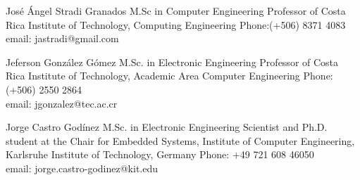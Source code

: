 \documentclass[]{friggeri-cv} %
\begin{document}
\begin{entrylist}

\entry
{}
{José Ángel Stradi Granados}
{M.Sc in Computer Engineering}
{Professor of Costa Rica Institute of Technology, Computing Engineering}
{Phone:(+506) 8371 4083 \\
email: jastradi@gmail.com
}

\entry
{}
{Jeferson González Gómez}
{M.Sc. in Electronic Engineering}
{Professor of Costa Rica Institute of Technology, Academic Area Computer Engineering}
{Phone: (+506) 2550 2864 \\
email: jgonzalez@tec.ac.cr
}

\entry
{}
{Jorge Castro Godínez}
{M.Sc. in Electronic Engineering}
{Scientist and Ph.D. student at the Chair for Embedded Systems, Institute of Computer Engineering, Karlsruhe Institute of Technology, Germany}
{Phone: +49 721 608 46050 \\
email: jorge.castro-godinez@kit.edu
}

\end{entrylist} 

\end{document}
